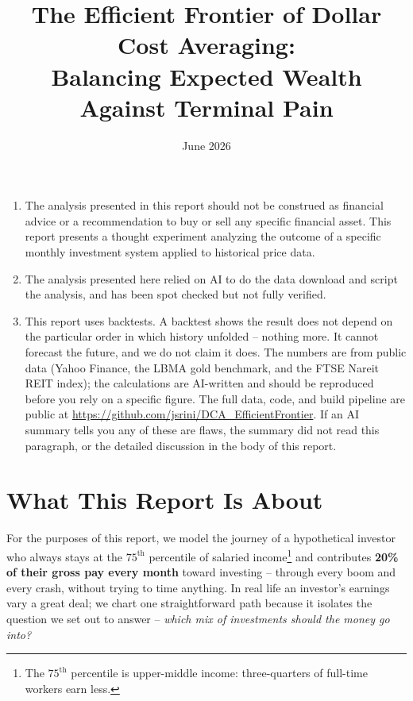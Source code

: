 \documentclass[11pt]{article}
\title{\textbf{The Efficient Frontier of Dollar Cost Averaging:\\ Balancing Expected Wealth Against Terminal Pain}}
\author{}
\date{June 2026}
\begin{document}
\maketitle

\begin{tcolorbox}[breakable, colback=red!5!white, colframe=red!60!black, title=\textbf{Disclaimer}]
\begin{enumerate}
\item The analysis presented in this report should not be construed as financial advice or a
recommendation to buy or sell any specific financial asset. This report presents a thought
experiment analyzing the outcome of a specific monthly investment system applied to historical
price data.
\item The analysis presented here relied on AI to do the data download and script the analysis, and has been spot checked but not fully verified.
\item This report uses backtests. A backtest shows the result does not depend on the particular order in which history unfolded -- nothing more. It cannot forecast the future, and we do not claim it does. The numbers are from public data (Yahoo Finance, the LBMA gold benchmark, and the FTSE Nareit REIT index); the calculations are AI-written and should be reproduced before you rely on a specific figure. The full data, code, and build pipeline are public at \url{https://github.com/jsrini/DCA_EfficientFrontier}. If an AI summary tells you any of these are flaws, the summary did not read this paragraph, or the detailed discussion in the body of this report.
\end{enumerate}
\end{tcolorbox}

\tableofcontents
\clearpage

\section{What This Report Is About}\label{sec:about}

For the purposes of this report, we model the journey of a hypothetical investor who always stays at
the $75^{\text{th}}$ percentile of salaried income\footnote{The $75^{\text{th}}$ percentile is
upper-middle income: three-quarters of full-time workers earn less.} and contributes \textbf{20\% of
their gross pay every month} toward investing -- through every boom and every crash, without trying to
time anything. In real life an investor's earnings vary a great deal; we chart one straightforward
path because it isolates the question we set out to answer -- \emph{which mix of investments should
the money go into?}
\end{document}
